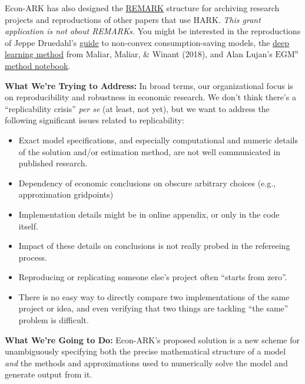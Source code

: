 \documentclass[12pt,pdftex,letterpaper]{article}
\begin{document}
\noindent Econ-ARK has also designed the \href{https://github.com/econ-ark/REMARK}{REMARK} structure for archiving research projects and reproductions of other papers that use HARK. \emph{This grant application is not about REMARKs.} You might be interested in the reproductions of Jeppe Druedahl's \href{https://econ-ark.org/materials/durableconsumertype/}{guide} to non-convex consumption-saving models, the \href{https://econ-ark.org/materials/deep-learning-euler-method-krusell-smith/}{deep learning method} from Maliar, Maliar, \& Winant (2018), and Alan Lujan's $\text{EGM}^n$ \href{https://econ-ark.org/materials/sequentialegm/}{method notebook}.

\vspace{0.5cm}

\noindent \textbf{What We're Trying to Address:} In broad terms, our organizational focus is on reproducibility and robustness in economic research. We don't think there's a ``replicability crisis'' \textit{per se} (at least, not yet), but we want to address the following significant issues related to replicability:

\begin{itemize}
	\item Exact model specifications, and especially computational and numeric details of the solution and/or estimation method, are not well communicated in published research.
	
	\item Dependency of economic conclusions on obscure arbitrary choices (e.g., approximation gridpoints)
	
	\item Implementation details might be in online appendix, or only in the code itself.
	
	\item Impact of these details on conclusions is not really probed in the refereeing process.
	
	\item Reproducing or replicating someone else's project often ``starts from zero''.
	
	\item There is no easy way to directly compare two implementations of the same project or idea, and even verifying that two things are tackling ``the same'' problem is difficult.
\end{itemize}

\vspace{0.25cm}

\noindent \textbf{What We're Going to Do:} Econ-ARK's proposed solution is a new scheme for unambiguously specifying both the precise mathematical structure of a model \textit{and} the methods and approximations used to numerically solve the model and generate output from it.
\end{document}

